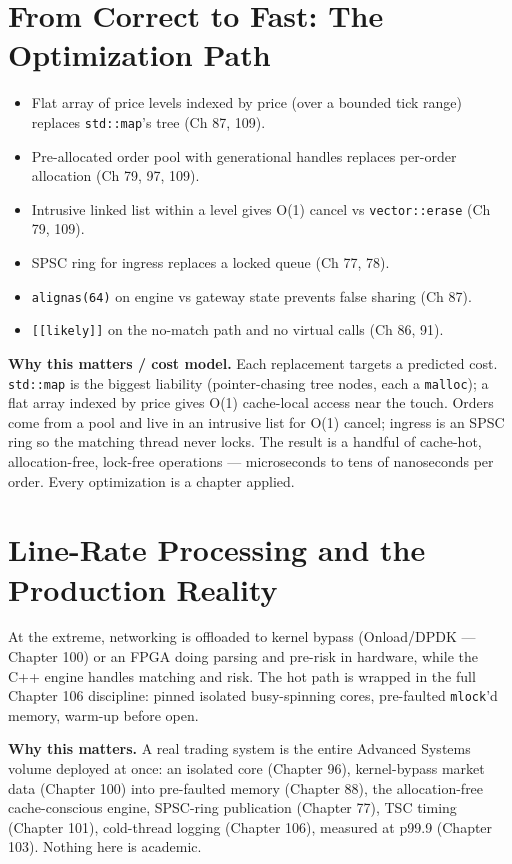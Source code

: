 \section{From Correct to Fast: The Optimization Path}
\begin{itemize}
\item Flat array of price levels indexed by price (over a bounded tick range) replaces \texttt{std::map}'s tree (Ch 87, 109).
\item Pre-allocated order pool with generational handles replaces per-order allocation (Ch 79, 97, 109).
\item Intrusive linked list within a level gives O(1) cancel vs \texttt{vector::erase} (Ch 79, 109).
\item SPSC ring for ingress replaces a locked queue (Ch 77, 78).
\item \texttt{alignas(64)} on engine vs gateway state prevents false sharing (Ch 87).
\item \texttt{[[likely]]} on the no-match path and no virtual calls (Ch 86, 91).
\end{itemize}

\textbf{Why this matters / cost model.} Each replacement targets a predicted cost. \texttt{std::map} is the biggest liability (pointer-chasing tree nodes, each a \texttt{malloc}); a flat array indexed by price gives O(1) cache-local access near the touch. Orders come from a pool and live in an intrusive list for O(1) cancel; ingress is an SPSC ring so the matching thread never locks. The result is a handful of cache-hot, allocation-free, lock-free operations --- microseconds to tens of nanoseconds per order. Every optimization is a chapter applied.

\section{Line-Rate Processing and the Production Reality}
At the extreme, networking is offloaded to kernel bypass (Onload/DPDK --- Chapter 100) or an FPGA doing parsing and pre-risk in hardware, while the C++ engine handles matching and risk. The hot path is wrapped in the full Chapter 106 discipline: pinned isolated busy-spinning cores, pre-faulted \texttt{mlock}'d memory, warm-up before open.

\textbf{Why this matters.} A real trading system is the entire Advanced Systems volume deployed at once: an isolated core (Chapter 96), kernel-bypass market data (Chapter 100) into pre-faulted memory (Chapter 88), the allocation-free cache-conscious engine, SPSC-ring publication (Chapter 77), TSC timing (Chapter 101), cold-thread logging (Chapter 106), measured at p99.9 (Chapter 103). Nothing here is academic.

